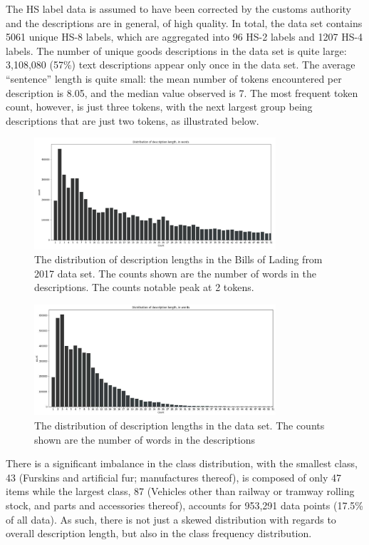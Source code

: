 The HS label data is assumed to have been corrected by the customs authority and the descriptions are in general, of high quality. In total, the data set contains 5061 unique HS-8 labels, which are aggregated into 96 HS-2 labels and 1207 HS-4 labels. The number of unique goods descriptions in the data set is quite large: 3,108,080 (57{\%}) text descriptions appear only once in the data set. The average “sentence” length is quite small: the mean number of tokens encountered per description is 8.05, and the median value observed is 7. The most frequent token count, however, is just three tokens, with the next largest group being descriptions that are just two tokens, as illustrated below.

\begin{figure}[ht]
    \centering
    \includegraphics[width=0.8\textwidth]{BOL2.png}
    \caption{The distribution of description lengths in the Bills of Lading from 2017 data set. The counts shown are the number of words in the descriptions. The counts notable peak at 2 tokens.}
    \label{fig:Bol2}
\end{figure}

\begin{figure}[ht]
    \centering
    \includegraphics[width=0.8\textwidth]{data.jpg}
    \caption{The distribution of description lengths in the data set. The counts shown are the number of words in the descriptions}
    \label{fig:Data}
\end{figure}

\newpage
There is a significant imbalance in the class distribution, with the smallest class, 43 (Furskins and artificial fur; manufactures thereof), is composed of only 47 items while the largest class, 87 (Vehicles other than railway or tramway rolling stock, and parts and accessories thereof), accounts for 953,291 data points (17.5{\%} of all data). As such, there is not just a skewed distribution with regards to overall description length, but also in the class frequency distribution.\\
\\

